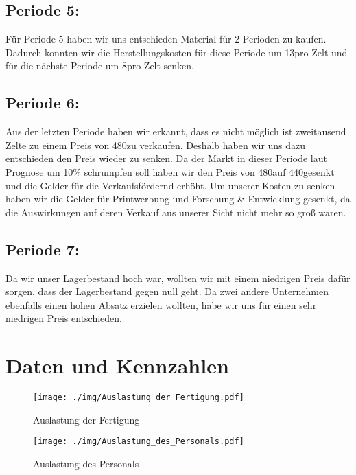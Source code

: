 \documentclass[a4paper, 12pt]{report}
\begin{document}
\begin{flushleft}
\section{Periode 5:}
Für Periode 5 haben wir uns entschieden Material für 2 Perioden zu kaufen.
Dadurch konnten wir die Herstellungskosten für diese Periode um 13\texteuro pro Zelt und für die nächste Periode um 8\texteuro pro Zelt senken.

\section{Periode 6:}
Aus der letzten Periode haben wir erkannt, dass es nicht möglich ist zweitausend Zelte zu einem Preis von 480\texteuro zu verkaufen.
Deshalb haben wir uns dazu entschieden den Preis wieder zu senken.
Da der Markt in dieser Periode laut Prognose um 10\% schrumpfen soll haben wir den Preis von 480\texteuro auf 440\texteuro gesenkt und die Gelder für die Verkaufsfördernd erhöht.
Um unserer Kosten zu senken haben wir die Gelder für Printwerbung und Forschung \& Entwicklung gesenkt, da die Auswirkungen auf deren Verkauf aus unserer Sicht nicht mehr so groß waren.


\section{Periode 7:}
Da wir unser Lagerbestand hoch war, wollten wir mit einem niedrigen Preis dafür sorgen,
dass der Lagerbestand gegen null geht.
Da zwei andere Unternehmen ebenfalls einen hohen Absatz erzielen wollten, habe wir uns für einen sehr niedrigen Preis entschieden.

\newpage
\chapter{Daten und Kennzahlen}
 
 \begin{figure}[th]
 \centering 
 \texttt{[image: ./img/Auslastung\_der\_Fertigung.pdf]}
 \caption[Auslastung der Fertigung]{Auslastung der Fertigung}
\end{figure}

 \begin{figure}[th]
 \centering 
 \texttt{[image: ./img/Auslastung\_des\_Personals.pdf]}
  \caption[Auslastung des Personals]{Auslastung des Personals}
\end{figure}
 

\end{flushleft}
\end{document}
